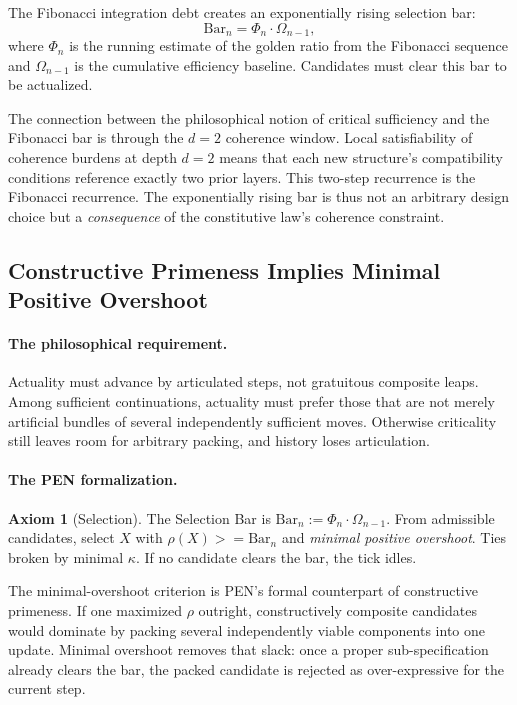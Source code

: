 \documentclass[11pt,a4paper]{article}
\def\geq{>=}%
\theoremstyle{plain}
\theoremstyle{definition}
\newtheorem{axiom}[theorem]{Axiom}
\theoremstyle{remark}
\begin{document}
The Fibonacci integration debt creates an exponentially rising selection bar:
\begin{equation}
\label{eq:bar}
\mathrm{Bar}_n = \Phi_n \cdot \Omega_{n-1},
\end{equation}
where $\Phi_n$ is the running estimate of the golden ratio from the Fibonacci sequence and $\Omega_{n-1}$ is the cumulative efficiency baseline.  Candidates must clear this bar to be actualized.

The connection between the philosophical notion of critical sufficiency and the Fibonacci bar is through the $d = 2$ coherence window.  Local satisfiability of coherence burdens at depth $d = 2$ means that each new structure's compatibility conditions reference exactly two prior layers.  This two-step recurrence is the Fibonacci recurrence.  The exponentially rising bar is thus not an arbitrary design choice but a \emph{consequence} of the constitutive law's coherence constraint.


\subsection{Constructive Primeness Implies Minimal Positive Overshoot}
\label{sec:primeness}

\paragraph{The philosophical requirement.}
Actuality must advance by articulated steps, not gratuitous composite leaps.  Among sufficient continuations, actuality must prefer those that are not merely artificial bundles of several independently sufficient moves.  Otherwise criticality still leaves room for arbitrary packing, and history loses articulation.

\paragraph{The PEN formalization.}
\begin{axiom}[Selection]
\label{ax:selection}
The Selection Bar is $\mathrm{Bar}_n := \Phi_n \cdot \Omega_{n-1}$.  From admissible candidates, select $X$ with $\rho(X) \geq \mathrm{Bar}_n$ and \emph{minimal positive overshoot}.  Ties broken by minimal $\kappa$.  If no candidate clears the bar, the tick idles.
\end{axiom}

The minimal-overshoot criterion is PEN's formal counterpart of constructive primeness.  If one maximized $\rho$ outright, constructively composite candidates would dominate by packing several independently viable components into one update.  Minimal overshoot removes that slack: once a proper sub-specification already clears the bar, the packed candidate is rejected as over-expressive for the current step.
\end{document}
